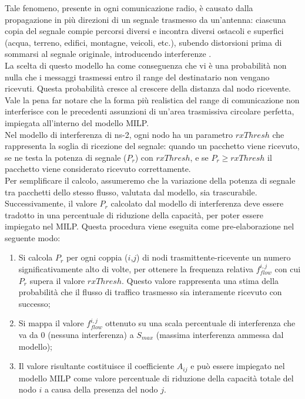 Tale fenomeno, presente in ogni comunicazione radio, è causato dalla propagazione in più direzioni di un segnale trasmesso da un'antenna: ciascuna copia del segnale compie percorsi diversi e incontra diversi ostacoli e superfici (acqua, terreno, edifici, montagne, veicoli, etc.), subendo distorsioni prima di sommarsi al segnale originale, introducendo interferenze \cite{umar2004mobile}. \\
La scelta di questo modello ha come conseguenza che vi è una probabilità non nulla che i messaggi trasmessi entro il range del destinatario non vengano ricevuti. Questa probabilità cresce al crescere della distanza dal nodo ricevente. \\
Vale la pena far notare che la forma più realistica del range di comunicazione non interferisce con le precedenti assunzioni di un'area trasmissiva circolare perfetta, impiegata all'interno del modello MILP.\\
Nel modello di interferenza di ns-2, ogni nodo ha un parametro $rxThresh$ che rappresenta la soglia di ricezione del segnale: quando un pacchetto viene ricevuto, se ne testa la potenza di segnale ($P_r$) con $rxThresh$, e se $ P_r \geq rxThresh$ il pacchetto viene considerato ricevuto correttamente. \\
Per semplificare il calcolo, assumeremo che la variazione della potenza di segnale tra pacchetti dello stesso flusso, valutata dal modello, sia trascurabile. \\
Successivamente, il valore $P_r$ calcolato dal modello di interferenza deve essere tradotto in una percentuale di riduzione della capacità, per poter essere impiegato nel MILP. Questa procedura viene eseguita come pre-elaborazione nel seguente modo:
\begin{enumerate}  
	\item Si calcola $P_r$ per ogni coppia ($i$,$j$) di nodi trasmittente-ricevente un numero significativamente alto di volte, per ottenere la frequenza relativa $f_{flow}^{i,j}$ con cui $P_r$ supera il valore $rxThresh$. Questo valore rappresenta una stima della probabilità che il flusso di traffico trasmesso sia interamente ricevuto con successo;
	\item Si mappa il valore $f_{flow}^{i,j}$ ottenuto su una scala percentuale di interferenza che va da $0$ (nessuna interferenza) a $S_{max}$ (massima interferenza ammessa dal modello);
	\item Il valore risultante costituisce il coefficiente $A_{ij}$ e può essere impiegato nel modello MILP come valore percentuale di riduzione della capacità totale del nodo $i$ a causa della presenza del nodo $j$.
\end{enumerate}







